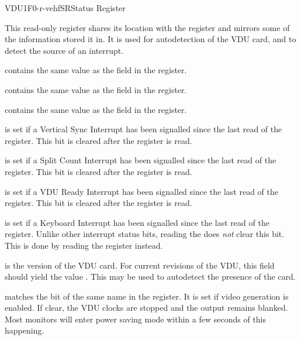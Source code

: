 \begin{ioport}{VDU}{1F0}{-r-vehf}{SR}{Status Register}

  This read-only register shares its location with the  register and
  mirrors some of the information stored it in. It is used for autodetection of
  the VDU card, and to detect the source of an interrupt.

  \begin{bitfield}
  \end{bitfield}

  \begin{description}
     contains the same value as the  field in the
     register.

     contains the same value as the  field in the
     register.

     contains the same value as the  field in the
     register.

     is set if a Vertical Sync Interrupt has been signalled
    since the last read of the  register. This bit is cleared after
    the register is read.

     is set if a Split Count Interrupt has been signalled
    since the last read of the  register. This bit is cleared after
    the register is read.

     is set if a VDU Ready Interrupt has been signalled since
    the last read of the  register. This bit is cleared after the
    register is read.

     is set if a Keyboard Interrupt has been signalled since
    the last read of the  register. Unlike other interrupt status
    bits, reading the  does {\em not\/} clear this bit. This is done
    by reading the  register instead.

     is the version of the VDU card. For current revisions
    of the VDU, this field should yield the value . This may be used
    to autodetect the presence of the card.

     matches the bit of the same name in the
     register. It is set if video generation is enabled. If
    clear, the VDU clocks are stopped and the output remains
    blanked. Most monitors will enter power saving mode within a few
    seconds of this happening.
  \end{description}

\end{ioport}






